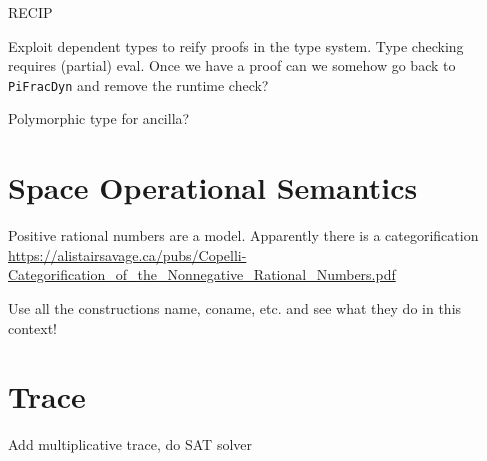 \documentclass[sigplan,10pt,review,anonymous]{acmart}
\begin{document}
RECIP 

Exploit dependent types to reify proofs in the type system. Type
checking requires (partial) eval. Once we have a proof can we somehow
go back to \verb|PiFracDyn| and remove the runtime check?

Polymorphic type for ancilla?

\section{Space Operational Semantics}
  
Positive rational numbers are a model. Apparently there is a
categorification
\url{https://alistairsavage.ca/pubs/Copelli-Categorification_of_the_Nonnegative_Rational_Numbers.pdf}

Use all the constructions name, coname, etc. and see what they do in this context!

\section{Trace}
  
Add multiplicative trace, do SAT solver


\end{document}
